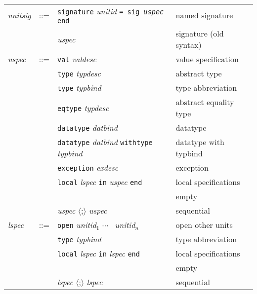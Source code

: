 \documentclass[fleqn]{article}
\begin{document}
\begin{quot}
\begin{tabular}{@{}lcll}
{\it unitsig\/} & ::= 
  & {\tt signature} {\it unitid} {\tt = sig {\it uspec\/} end} 
                                                & named signature \\
& & {\it uspec\/}                               & signature (old syntax)\\[2ex]
{\it uspec} & ::= & {\tt val} {\it valdesc}     & value specification\\
& & {\tt type} {\it typdesc}                    & abstract type \\
& & {\tt type} {\it typbind}            & type abbreviation \\
& & {\tt eqtype} {\it typdesc}          & abstract equality type\\
& & {\tt datatype} {\it datbind}        & datatype\\
& & {\tt datatype} {\it datbind} {\tt withtype} {\it typbind\/} &
                                         datatype with typbind\\
& & {\tt exception} {\it exdesc}        & exception\\
& & {\tt local} {\it lspec} {\tt in} {\it uspec} {\tt end}
                                        & local specifications\\
& &                                     & empty\\
& & {\it uspec} $\langle${;}$\rangle$ {\it uspec}       & sequential 
\\[2ex]

{\it lspec} & ::= & {\tt open} {\it unitid$_1$\/} $\cdots$\ {\it
  unitid$_n$\/}
                                        & open other units\\
& & {\tt type} {\it typbind}            & type abbreviation \\
& & {\tt local} {\it lspec\/} {\tt in} {\it lspec} {\tt end}
& local specifications\\
& &                                             & empty\\
& & {\it lspec\/} $\langle${;}$\rangle$ {\it lspec\/} & sequential\\
\end{tabular}
\end{quot}
\end{document}
